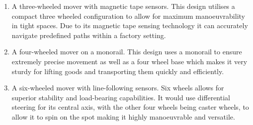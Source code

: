 \documentclass[12pt]{article}
\begin{document}
\begin{enumerate}
    \item A three-wheeled mover with magnetic tape sensors. This design utilises a compact three wheeled configuration to allow for maximum manoeuvrability in tight spaces. Due to its magnetic tape sensing technology it can accurately navigate predefined paths within a factory setting.
    \item A four-wheeled mover on a monorail. This design uses a monorail to ensure extremely precise movement as well as a four wheel base which makes it very sturdy for lifting goods and transporting them quickly and efficiently.  
    \item A six-wheeled mover with line-following sensors. Six wheels allows for superior stability and load-bearing capabilities. It would use differential steering for its central axis, with the other four wheels being caster wheels, to allow it to spin on the spot making it highly manoeuvrable and versatile.
 \end{enumerate}
\end{document}
